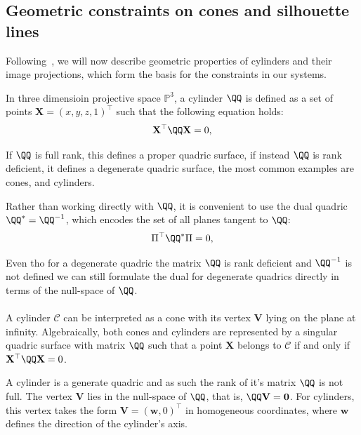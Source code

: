\subsection{Geometric constraints on cones and  silhouette lines}
\label{sec:constraints}

Following~\cite{gummeson22pose, gummeson24relative}, we will now describe geometric properties of cylinders and their image projections, which form the basis for the constraints in our systems.

In three dimensioin projective space $\mathbb{P}^3$, a cylinder $\QQ$ is defined as a set of points $\mathbf{X} = (x, y, z, 1)^\top$ such that the following equation holds:
\begin{equation}
	\mathbf{X}^\top \QQ \mathbf{X} = 0,
\end{equation}

If $\QQ$ is full rank, this defines a proper quadric surface, if instead $\QQ$ is rank deficient, it defines a degenerate quadric surface, the most common examples are cones, and cylinders.

Rather than working directly with $\QQ$, it is convenient to use the dual quadric $\QQ^* = \QQ^{-1}$, which encodes the set of all planes tangent to $\QQ$:
\begin{equation}
	\Pi^\top \QQ^* \Pi = 0,
\end{equation}

Even tho for a degenerate quadric the matrix $\QQ$ is rank deficient and $\QQ^{-1}$ is not defined we can still formulate the dual for degenerate quadrics directly in terms of the null-space of $\QQ$. 

\paragraph{}A cylinder $\mathcal{C}$ can be interpreted as a cone with its vertex $\mathbf{V}$ lying on the plane at infinity. Algebraically, both cones and cylinders are represented by a singular quadric surface with matrix $\QQ$ such that a point $\mathbf{X}$ belongs to $\mathcal{C}$ if and only if $\mathbf{X}^\top \QQ \mathbf{X} = 0$.

A cylinder is a generate quadric and as such the rank of it's matrix $\QQ$ is not full. The vertex $\mathbf{V}$ lies in the null-space of $\QQ$, that is, $\QQ \mathbf{V} = \mathbf{0}$. For cylinders, this vertex takes the form $\mathbf{V} = {(\mathbf{w}, 0)}^\top$ in homogeneous coordinates, where $\mathbf{w}$ defines the direction of the cylinder’s axis.

